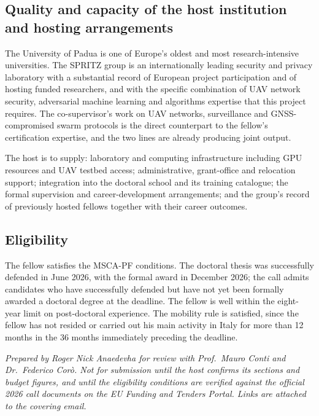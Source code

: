 \documentclass[11pt,a4paper]{article}
\begin{document}
\subsection{Quality and capacity of the host institution and hosting arrangements}
The University of Padua is one of Europe's oldest and most research-intensive universities. The SPRITZ group is an internationally leading security and privacy laboratory with a substantial record of European project participation and of hosting funded researchers, and with the specific combination of UAV network security, adversarial machine learning and algorithms expertise that this project requires. The co-supervisor's work on UAV networks, surveillance and GNSS-compromised swarm protocols is the direct counterpart to the fellow's certification expertise, and the two lines are already producing joint output.

The host is to supply: laboratory and computing infrastructure including GPU resources and UAV testbed access; administrative, grant-office and relocation support; integration into the doctoral school and its training catalogue; the formal supervision and career-development arrangements; and the group's record of previously hosted fellows together with their career outcomes.

\subsection{Eligibility}
The fellow satisfies the MSCA-PF conditions. The doctoral thesis was successfully defended in June 2026, with the formal award in December 2026; the call admits candidates who have successfully defended but have not yet been formally awarded a doctoral degree at the deadline. The fellow is well within the eight-year limit on post-doctoral experience. The mobility rule is satisfied, since the fellow has not resided or carried out his main activity in Italy for more than 12 months in the 36 months immediately preceding the deadline.

\vspace{0.4em}
{\footnotesize\itshape Prepared by Roger Nick Anaedevha for review with Prof.\ Mauro Conti and Dr.\ Federico Cor\`o. Not for submission until the host confirms its sections and budget figures, and until the eligibility conditions are verified against the official 2026 call documents on the EU Funding and Tenders Portal. Links are attached to the covering email.}
\end{document}
